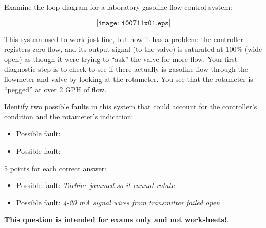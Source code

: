 

Examine the loop diagram for a laboratory gasoline flow control system:

$$\texttt{[image: i00711x01.eps]}$$

This system used to work just fine, but now it has a problem: the controller registers zero flow, and its output signal (to the valve) is saturated at 100\% (wide open) as though it were trying to ``ask'' the valve for more flow.  Your first diagnostic step is to check to see if there actually is gasoline flow through the flowmeter and valve by looking at the rotameter.  You see that the rotameter is ``pegged'' at over 2 GPH of flow.

Identify two possible faults in this system that could account for the controller's condition and the rotameter's indication:

\begin{itemize}
\item{} Possible fault:
\vskip 10pt
\item{} Possible fault:
\end{itemize}







5 points for each correct answer:

\begin{itemize}
\item{} Possible fault: {\it Turbine jammed so it cannot rotate}
\item{} Possible fault: {\it 4-20 mA signal wires from transmitter failed open}
\end{itemize}







{\bf This question is intended for exams only and not worksheets!}.



